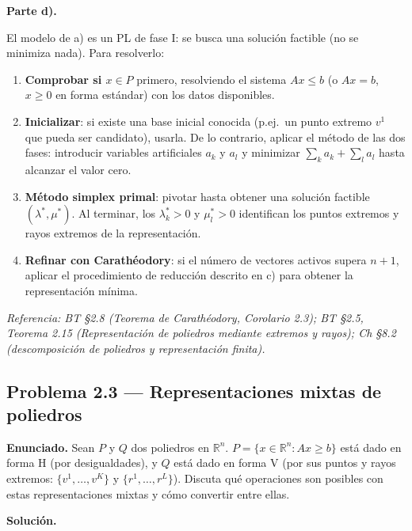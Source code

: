 \documentclass{article}
\begin{document}
\medskip
\noindent\textbf{Parte d).}

El modelo de a) es un PL de fase I: se busca una solución factible (no se minimiza nada). Para resolverlo:

\begin{enumerate}[1.]
\item \textbf{Comprobar si $x \in P$} primero, resolviendo el sistema $Ax \leq b$ (o $Ax = b$, $x \geq 0$ en forma estándar) con los datos disponibles.
\item \textbf{Inicializar}: si existe una base inicial conocida (p.ej.\ un punto extremo $v^1$ que pueda ser candidato), usarla. De lo contrario, aplicar el método de las dos fases: introducir variables artificiales $a_k$ y $a_l$ y minimizar $\sum_k a_k + \sum_l a_l$ hasta alcanzar el valor cero.
\item \textbf{Método simplex primal}: pivotar hasta obtener una solución factible $(\lambda^*, \mu^*)$. Al terminar, los $\lambda_k^* > 0$ y $\mu_l^* > 0$ identifican los puntos extremos y rayos extremos de la representación.
\item \textbf{Refinar con Carathéodory}: si el número de vectores activos supera $n + 1$, aplicar el procedimiento de reducción descrito en c) para obtener la representación mínima.
\end{enumerate}

\medskip\noindent\textit{Referencia: BT §2.8 (Teorema de Carathéodory, Corolario 2.3); BT §2.5, Teorema 2.15 (Representación de poliedros mediante extremos y rayos); Ch §8.2 (descomposición de poliedros y representación finita).}

\newpage
\subsection*{Problema 2.3 — Representaciones mixtas de poliedros}

\textbf{Enunciado.} Sean $P$ y $Q$ dos poliedros en $\mathbb{R}^n$. $P = \{x \in \mathbb{R}^n : Ax \geq b\}$ está dado en forma H (por desigualdades), y $Q$ está dado en forma V (por sus puntos y rayos extremos: $\{v^1,\ldots,v^K\}$ y $\{r^1,\ldots,r^L\}$). Discuta qué operaciones son posibles con estas representaciones mixtas y cómo convertir entre ellas.

\medskip
\noindent\textbf{Solución.}
\end{document}
